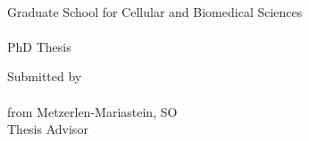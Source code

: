 \begin{titlepage}
	\begin{addmargin}[-1cm]{-3cm}
    \begin{center}
        \large  

        \hfill

        \vfill

        \begingroup
            \color{Maroon}\spacedallcaps{\myTitle} \\ \bigskip
        \endgroup
		Graduate School for Cellular and Biomedical Sciences\\
		\myUni\\
		PhD Thesis 

        \vfill


		Submitted by\\
		\bigskip
		\spacedallcaps{\myName}\\
		from Metzerlen-Mariastein, SO\\
		\bigskip
		Thesis Advisor\\
		\medskip
		\myProf \\
        \myDepartment \\                            
        \myFaculty \\
        \myUni \\
		\bigskip
        \myTime                 
    \end{center}  
  \end{addmargin}       
\end{titlepage}   